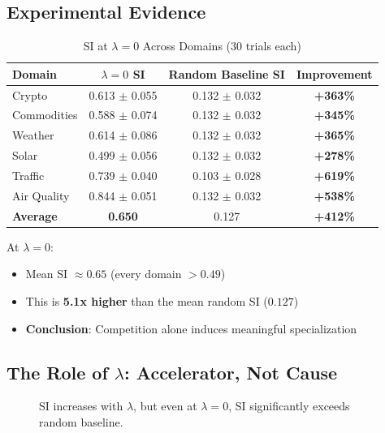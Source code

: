 \documentclass[11pt,a4paper]{article}
\theoremstyle{definition}
\theoremstyle{plain}
\begin{document}
\subsection{Experimental Evidence}

\begin{table}[h]
\centering
\caption{SI at $\lambda = 0$ Across Domains (30 trials each)}
\begin{tabular}{l|cc|c}
\toprule
Domain & $\lambda = 0$ SI & Random Baseline SI & Improvement \\
\midrule
Crypto & 0.613 $\pm$ 0.055 & 0.132 $\pm$ 0.032 & \textbf{+363\%} \\
Commodities & 0.588 $\pm$ 0.074 & 0.132 $\pm$ 0.032 & \textbf{+345\%} \\
Weather & 0.614 $\pm$ 0.086 & 0.132 $\pm$ 0.032 & \textbf{+365\%} \\
Solar & 0.499 $\pm$ 0.056 & 0.132 $\pm$ 0.032 & \textbf{+278\%} \\
Traffic & 0.739 $\pm$ 0.040 & 0.103 $\pm$ 0.028 & \textbf{+619\%} \\
Air Quality & 0.844 $\pm$ 0.051 & 0.132 $\pm$ 0.032 & \textbf{+538\%} \\
\midrule
\textbf{Average} & \textbf{0.650} & 0.127 & \textbf{+412\%} \\
\bottomrule
\end{tabular}
\end{table}

\begin{keypoint}
At $\lambda = 0$:
\begin{itemize}
    \item Mean SI $\approx 0.65$ (every domain $> 0.49$)
    \item This is \textbf{5.1x higher} than the mean random SI ($0.127$)
    \item \textbf{Conclusion}: Competition alone induces meaningful specialization
\end{itemize}
\end{keypoint}

\subsection{The Role of $\lambda$: Accelerator, Not Cause}

\begin{figure}[h]
\centering
{}
\caption{SI increases with $\lambda$, but even at $\lambda = 0$, SI significantly exceeds random baseline.}
\end{figure}
\end{document}
